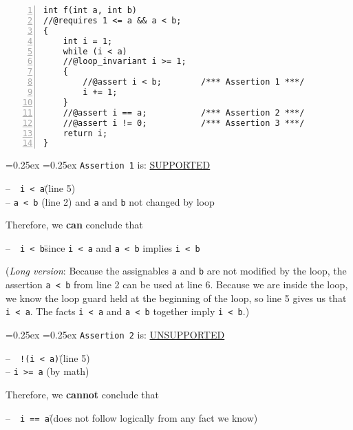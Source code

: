 \begin{lstlisting}[numbers=left]
int f(int a, int b)
//@requires 1 <= a && a < b;
{
    int i = 1;
    while (i < a)
    //@loop_invariant i >= 1;
    {
        //@assert i < b;        /*** Assertion 1 ***/
        i += 1;
    }
    //@assert i == a;           /*** Assertion 2 ***/
    //@assert i != 0;           /*** Assertion 3 ***/
    return i;
}
\end{lstlisting}

\begin{framed}
\topsep=0.25ex
\partopsep=0.25ex
\lstinline'Assertion 1' is: \underline{SUPPORTED}
\begin{tabbing}
--~~\= \lstinline'i < a'\qquad\= (line 5)\\
--\> \lstinline'a < b'\> (line 2) and \lstinline'a' and \lstinline'b' not changed by loop
\end{tabbing}
Therefore, we \textbf{can} conclude that
\begin{tabbing}
--~~\= \lstinline'i < b'\qquad\= since \lstinline'i < a' and \lstinline'a < b' implies \lstinline'i < b'
\end{tabbing}

(\emph{Long version}: Because the assignables \lstinline'a' and
\lstinline'b' are not modified by the loop, the assertion %
\lstinline'a < b' from line 2 can be used at line 6. Because we are inside the
loop, we know the loop guard held at the beginning of the loop, so
line 5 gives us that \lstinline'i < a'. The facts \lstinline'i < a'
and \lstinline'a < b' together imply \lstinline'i < b'.)
\end{framed}

\vfill
\begin{framed}
\topsep=0.25ex
\partopsep=0.25ex
\lstinline'Assertion 2' is: \underline{UNSUPPORTED}

\begin{tabbing}
--~~\= \lstinline'!(i < a)'\qquad\= (line 5)\\
--\>   \lstinline'i >= a'\qquad\> (by math)
\end{tabbing}
Therefore, we \textbf{cannot} conclude that
\begin{tabbing}
--~~\= \lstinline'i == a'\qquad\quad\= (does not follow logically from any fact we know)
\end{tabbing}

\end{framed}

